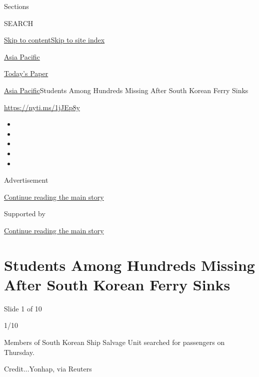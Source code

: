 Sections

SEARCH

\protect\hyperlink{site-content}{Skip to
content}\protect\hyperlink{site-index}{Skip to site index}

\href{https://www.nytimes.com/section/world/asia}{Asia Pacific}

\href{https://myaccount.nytimes.com/auth/login?response_type=cookie\&client_id=vi}{}

\href{https://www.nytimes.com/section/todayspaper}{Today's Paper}

\href{/section/world/asia}{Asia Pacific}\textbar{}Students Among
Hundreds Missing After South Korean Ferry Sinks

\url{https://nyti.ms/1jJEp8y}

\begin{itemize}
\item
\item
\item
\item
\item
\end{itemize}

Advertisement

\protect\hyperlink{after-top}{Continue reading the main story}

Supported by

\protect\hyperlink{after-sponsor}{Continue reading the main story}

\hypertarget{students-among-hundreds-missing-after-south-korean-ferry-sinks}{%
\section{Students Among Hundreds Missing After South Korean Ferry
Sinks}\label{students-among-hundreds-missing-after-south-korean-ferry-sinks}}

Slide 1 of 10

1/10

Members of South Korean Ship Salvage Unit searched for passengers on
Thursday.

Credit...Yonhap, via Reuters

